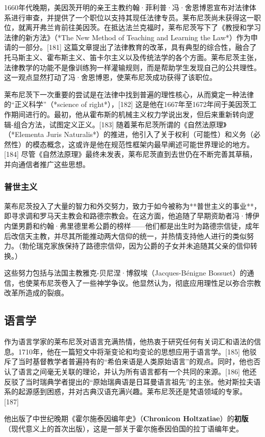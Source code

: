 1660年代晚期，美因茨开明的亲王主教约翰·菲利普·冯·舍恩博恩宣布对法律体系进行审查，并提供了一个职位以支持其现任法律专员。莱布尼茨尚未获得这一职位，就离开弗兰肯前往美因茨。在抵达法兰克福时，莱布尼茨写下了《教授和学习法律的新方法》（*The New Method of Teaching and Learning the Law*）作为申请的一部分。[181] 这篇文章提出了法律教育的改革，具有典型的综合性，融合了托马斯主义、霍布斯主义、笛卡尔主义以及传统法学的各个方面。莱布尼茨主张，法律教学的功能不是像训练狗一样灌输规则，而是帮助学生发现自己的公共理性。这一观点显然打动了冯·舍恩博恩，使莱布尼茨成功获得了该职位。

莱布尼茨下一次重要的尝试是在法律中找到普遍的理性核心，从而奠定一种法律的“正义科学”（*science of right*），[182] 这是他在1667年至1672年间于美因茨工作期间进行的。最初，他从霍布斯的机械主义权力学说出发，但后来重新转向逻辑-组合方法，试图定义正义。[183] 随着莱布尼茨所谓的《自然法原理》（*Elementa Juris Naturalis*）的推进，他引入了关于权利（可能性）和义务（必然性）的模态概念，这或许是他在规范性框架内最早阐述可能世界理论的地方。[184] 尽管《自然法原理》最终未发表，莱布尼茨直到去世仍在不断完善其草稿，并向通信者推广这些思想。
\subsubsection{普世主义}
莱布尼茨投入了大量的智力和外交努力，致力于如今被称为**普世主义的事业**，即寻求调和罗马天主教会和路德宗教会。在这方面，他追随了早期资助者冯·博伊内堡男爵和约翰·弗里德里希公爵的榜样——他们都是出生时为路德宗信徒，成年后改信天主教，并尽其所能推动两大信仰的统一，并热情支持他人进行的类似努力。（勃伦瑞克家族保持了路德宗信仰，因为公爵的子女并未追随其父亲的信仰转换。）  

这些努力包括与法国主教雅克-贝尼涅·博叙埃（Jacques-Bénigne Bossuet）的通信，也使莱布尼茨卷入了一些神学争议。他显然认为，彻底应用理性足以弥合宗教改革所造成的裂痕。
\subsection{语言学}
作为语言学家的莱布尼茨对语言充满热情，他热衷于研究任何有关词汇和语法的信息。1710年，他在一篇短文中将渐变论和均变论的思想应用于语言学。[185] 他驳斥了当时基督教学者普遍持有的“希伯来语是人类原始语言”的观点。同时，他也否认了语言之间毫无关联的理论，并认为所有语言都有一个共同的来源。[186] 他还反驳了当时瑞典学者提出的“原始瑞典语是日耳曼语言祖先”的主张。他对斯拉夫语系的起源感到困惑，并对古典汉语充满兴趣。莱布尼茨还是梵语领域的专家。[187]

他出版了中世纪晚期《霍尔施泰因编年史》（\textbf{Chronicon Holtzatiae}）的\textbf{初版}（现代意义上的首次出版），这是一部关于霍尔施泰因伯国的拉丁语编年史。

